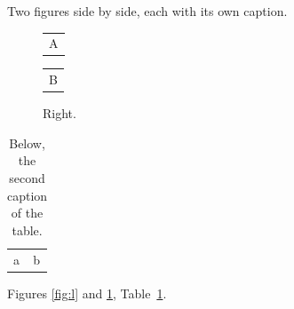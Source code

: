\documentclass{article}
\begin{document}
Two figures side by side, each with its own caption.
\begin{figure}[h]
\centering
\begin{minipage}{0.45\textwidth}
\centering
\begin{tabular}{c}A\end{tabular}
\caption{Left, with a caption long enough to take two lines.}\label{fig:l}
\end{minipage}\hfill
\begin{minipage}{0.45\textwidth}
\centering
\begin{tabular}{c}B\end{tabular}
\caption{Right.}\label{fig:r}
\end{minipage}
\end{figure}
\begin{table}[h]
\centering
\caption{Above.}
\begin{tabular}{ll}a & b\\\end{tabular}
\caption{Below, the second caption of the table.}\label{tab:b}
\end{table}
Figures \ref{fig:l} and \ref{fig:r}, Table~\ref{tab:b}.
\end{document}
